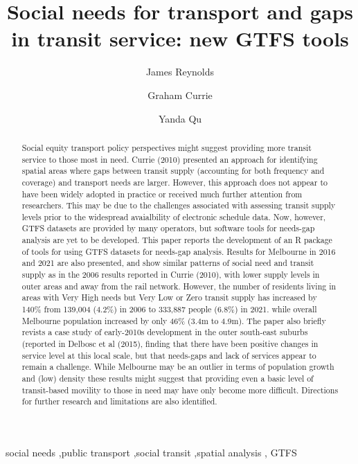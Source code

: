 \documentclass[preprint, 3p,
authoryear]{elsarticle} %
\begin{document}
\begin{frontmatter}

  \title{Social needs for transport and gaps in transit service: new
GTFS tools}
    \author[Public Transport Research Group (PTRG)]{James Reynolds%
  }
    \author[Public Transport Research Group (PTRG)]{Graham Currie%
  }
    \author[Public Transport Research Group (PTRG)]{Yanda Qu%
  }
  
  \begin{abstract}
  Social equity transport policy perspectives might suggest providing
  more transit service to those most in need. Currie (2010) presented an
  approach for identifying spatial areas where gaps between transit
  supply (accounting for both frequency and coverage) and transport
  needs are larger. However, this approach does not appear to have been
  widely adopted in practice or received much further attention from
  researchers. This may be due to the challenges associated with
  assessing transit supply levels prior to the widespread avaialbility
  of electronic schedule data. Now, however, GTFS datasets are provided
  by many operators, but software tools for needs-gap analysis are yet
  to be developed. This paper reports the development of an R package of
  tools for using GTFS datasets for needs-gap analysis. Results for
  Melbourne in 2016 and 2021 are also presented, and show similar
  patterns of social need and transit supply as in the 2006 results
  reported in Currie (2010), with lower supply levels in outer areas and
  away from the rail network. However, the number of residents living in
  areas with Very High needs but Very Low or Zero transit supply has
  increased by 140\% from 139,004 (4.2\%) in 2006 to 333,887 people
  (6.8\%) in 2021. while overall Melbourne population increased by only
  46\% (3.4m to 4.9m). The paper also briefly revists a case study of
  early-2010s development in the outer south-east suburbs (reported in
  Delbosc et al (2015), finding that there have been positive changes in
  service level at this local scale, but that needs-gaps and lack of
  services appear to remain a challenge. While Melbourne may be an
  outlier in terms of population growth and (low) density these results
  might suggest that providing even a basic level of transit-based
  movility to those in need may have only become more difficult.
  Directions for further research and limitations are also identified.
  \end{abstract}
    \begin{keyword}
    social needs \sep public transport \sep social transit \sep spatial
analysis \sep 
    GTFS
  \end{keyword}
  

\end{frontmatter}
\end{document}
